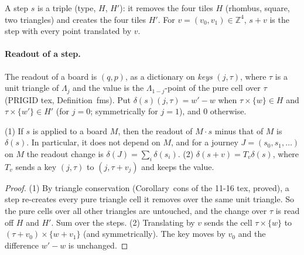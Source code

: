 \documentclass[11pt]{article}
\theoremstyle{definition}\newtheorem{definition}[theorem]{Definition}\newtheorem{remark}[theorem]{Remark}
\newcommand{\Z}{\mathbb Z}
\begin{document}
A step $s$ is a triple (type, $H$, $H'$): it removes the four tiles $H$ (rhombus, square, two triangles) and creates the four tiles $H'$. For $v=(v_0,v_1)\in\Z^4$, $s+v$ is the step with every point translated by $v$.

\paragraph{Readout of a step.} The readout of a board is $(q,p)$, as a dictionary on \emph{keys} $(j,\tau)$, where $\tau$ is a unit triangle of $\Lambda_j$ and the value is the $\Lambda_{1-j}$-point of the pure cell over $\tau$ (PRIGID tex, Definition~fms). Put $\delta(s)(j,\tau)=w'-w$ when $\tau\times\{w\}\in H$ and $\tau\times\{w'\}\in H'$ (for $j=0$; symmetrically for $j=1$), and $0$ otherwise.

\begin{lemma}\label{lem:delta}
(1) If $s$ is applied to a board $M$, then the readout of $M\cdot s$ minus that of $M$ is $\delta(s)$. In particular, it does not depend on $M$, and for a journey $J=(s_0,s_1,\dots)$ on $M$ the readout change is $\delta(J)=\sum_i\delta(s_i)$.
(2) $\delta(s+v)=T_v\delta(s)$, where $T_v$ sends a key $(j,\tau)$ to $(j,\tau+v_j)$ and keeps the value.
\end{lemma}
\begin{proof}
(1) By triangle conservation (Corollary~cons of the 11-16 tex, proved), a step re-creates every pure triangle cell it removes over the same unit triangle. So the pure cells over all other triangles are untouched, and the change over $\tau$ is read off $H$ and $H'$. Sum over the steps.
(2) Translating by $v$ sends the cell $\tau\times\{w\}$ to $(\tau+v_0)\times\{w+v_1\}$ (and symmetrically). The key moves by $v_0$ and the difference $w'-w$ is unchanged.
\end{proof}
\end{document}
